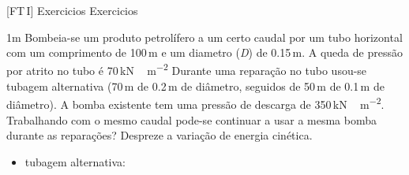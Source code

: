 \documentclass[\mainfilename]{subfiles}
\begin{document}
[FT\,I]
{Exercicios}
{Exercicios}

\begin{questionBox}1m{ %
    Bombeia-se um produto petrolífero a um certo caudal por um tubo horizontal com um comprimento de 100\,\si{\metre} e um diametro (\textit{D}) de 0.15\,\si{\metre}. A queda de pressão por atrito no tubo é 70\,\si{\kilo\newton\,\metre^{-2}} Durante uma reparação no tubo usou-se tubagem alternativa (70\,\si{\metre} de 0.2\,\si{\metre} de diâmetro, seguidos de 50\,\si{\metre} de 0.1\,\si{\metre} de diâmetro). A bomba existente tem uma pressão de descarga de 350\,\si{\kilo\newton\,\metre^{-2}}. Trabalhando com o mesmo caudal pode-se continuar a usar a mesma bomba durante as reparações? Despreze a variação de energia cinética. 
} %
    
    \begin{itemize}
        \item tubagem alternativa: 
        \begin{itemize}
        \end{itemize}
    \end{itemize}


\end{questionBox}
\end{document}
